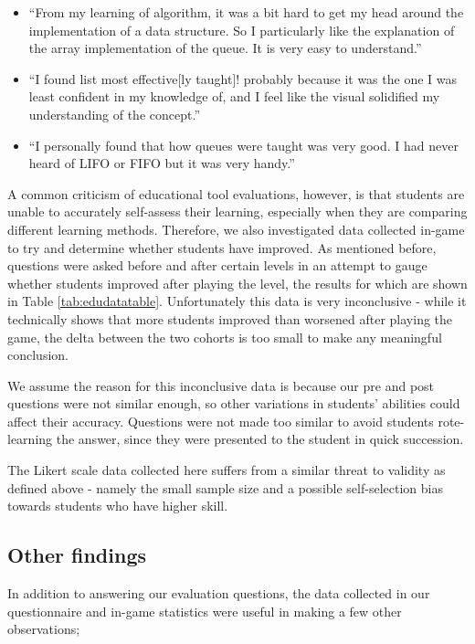 \documentclass[11pt]{article}
\begin{document}
\begin{spacing}{1.5}
\begin{itemize}
  \item ``From my learning of algorithm, it was a bit hard to get my head around the implementation of a data structure. So I particularly like the explanation of the array implementation of the queue. It is very easy to understand.''
  \item ``I found list most effective[ly taught]! probably because it was the one I was least confident in my knowledge of, and I feel like the visual solidified my understanding of the concept.''
  \item ``I personally found that how queues were taught was very good. I had never heard of LIFO or FIFO but it was very handy.''
\end{itemize}
\end{spacing}
A common criticism of educational tool evaluations, however, is that students are unable to accurately self-assess their learning, especially when they are comparing different learning methods\cite{Battistella}. Therefore, we also investigated data collected in-game to try and determine whether students have improved. As mentioned before, questions were asked before and after certain levels in an attempt to gauge whether students improved after playing the level, the results for which are shown in Table \ref{tab:edudatatable}. Unfortunately this data is very inconclusive - while it technically shows that more students improved than worsened after playing the game, the delta between the two cohorts is too small to make any meaningful conclusion.\par
We assume the reason for this inconclusive data is because our pre and post questions were not similar enough, so other variations in students' abilities could affect their accuracy. Questions were not made too similar to avoid students rote-learning the answer, since they were presented to the student in quick succession.\par
The Likert scale data collected here suffers from a similar threat to validity as defined above - namely the small sample size and a possible self-selection bias towards students who have higher skill.
\subsection{Other findings}
In addition to answering our evaluation questions, the data collected in our questionnaire and in-game statistics were useful in making a few other observations;
\end{document}

